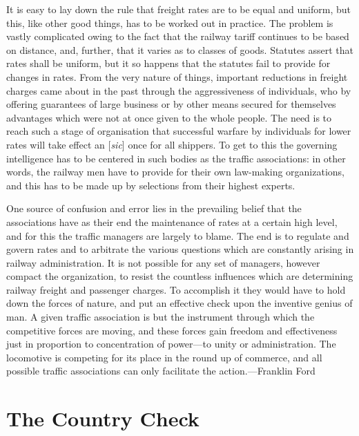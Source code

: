 \documentclass[twoside,symmetric,nobib,justified]{tufte-book}
\let\oldchapter\chapter
\def\chapter{%
  \setcounter{footnote}{0}%
  \oldchapter
}
\begin{document}
It is easy to lay down the rule that freight rates are to be equal and
uniform, but this, like other good things, has to be worked out in
practice. The problem is vastly complicated owing to the fact that the
railway tariff continues to be based on distance, and, further, that it
varies as to classes of goods. Statutes assert that rates shall be
uniform, but it so happens that the statutes fail to provide for changes
in rates. From the very nature of things, important reductions in
freight charges came about in the past through the aggressiveness of
individuals, who by offering guarantees of large business or by other
means secured for themselves advantages which were not at once given to
the whole people. The need is to reach such a stage of organisation that
successful warfare by individuals for lower rates will take effect an
{[}\emph{sic}{]} once for all shippers. To get to this the governing
intelligence has to be centered in such bodies as the traffic
associations: in other words, the railway men have to provide for their
own law-making organizations, and this has to be made up by selections
from their highest experts.

One source of confusion and error lies in the prevailing belief that the
associations have as their end the maintenance of rates at a certain
high level, and for this the traffic managers are largely to blame. The
end is to regulate and govern rates and to arbitrate the various
questions which are constantly arising in railway administration. It is
not possible for any set of managers, however compact the organization,
to resist the countless influences which are determining railway freight
and passenger charges. To accomplish it they would have to hold down the
forces of nature, and put an effective check upon the inventive genius
of man. A given traffic association is but the instrument through which
the competitive forces are moving, and these forces gain freedom and
effectiveness just in proportion to concentration of power---to unity or
administration. The locomotive is competing for its place in the round
up of commerce, and all possible traffic associations can only
facilitate the action.---Franklin Ford

\chapter[The Country Check]{The Country Check}
\label{ch:The Country Check}

\vspace{.2in}
\end{document}
